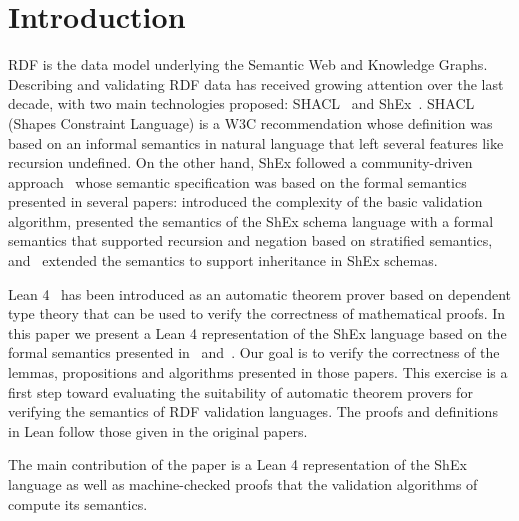 \section{Introduction} \label{sec:introduction}

RDF is the data model underlying the Semantic Web and Knowledge Graphs.
 Describing and validating RDF data has received growing attention
 over the last decade, with two main technologies proposed:
   SHACL~\cite{SHACL} and ShEx~\cite{PGS14}.
 SHACL (Shapes Constraint Language) is a W3C recommendation whose definition
  was based on an informal semantics in natural language that left several features like recursion undefined.
 On the other hand, ShEx followed a community-driven approach~\cite{shex_standard} 
  whose semantic specification was based  
  on the formal semantics presented in several papers:
  \cite{SBG15} introduced the complexity of the basic validation algorithm, 
  \cite{BGP17} presented the semantics of the ShEx schema language 
   with a formal semantics that supported recursion and negation 
   based on stratified semantics, 
   and~\cite{ShExInheritance} 
   extended the semantics to support inheritance in ShEx schemas.

 Lean 4~\cite{Moura2021} has been introduced as an automatic theorem prover based on dependent type theory
   that can be used to verify the correctness of mathematical proofs.
 In this paper we present a Lean 4 representation of the ShEx
   language based on the formal semantics presented in~\cite{BGP17} and~\cite{ShExInheritance}.
 Our goal is to verify the correctness of the lemmas, propositions and algorithms presented in those papers.
 This exercise is a first step toward evaluating the suitability of automatic theorem provers
 for verifying the semantics of RDF validation languages.
 The proofs and definitions in Lean follow those given in the original papers.
 
 The main contribution of the paper is a Lean 4 representation of the ShEx language as well as 
 machine-checked proofs that the validation algorithms of~\cite{BGP17} compute its semantics.
 
